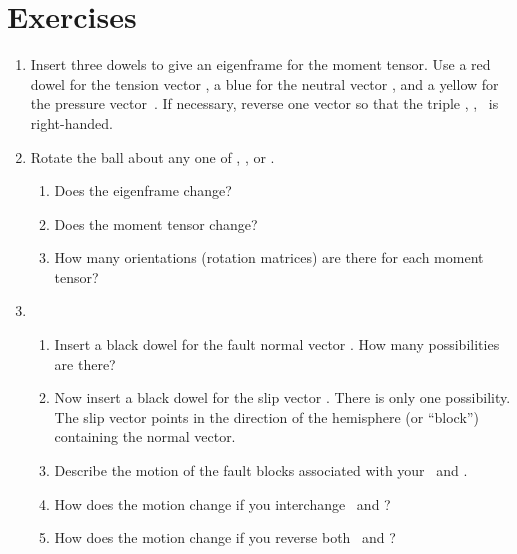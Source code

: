\documentclass[11pt,titlepage,fleqn]{article}
\begin{document}

\pagebreak
\section*{Exercises}

\begin{enumerate}
\item Insert three dowels to give an eigenframe for the moment tensor. Use a red dowel for the tension vector \mbT, a blue for the neutral vector \mbB, and a yellow for the pressure vector~\mbP. If necessary, reverse one vector so that the triple \mbT, \mbB, \mbP\ is right-handed.


\item Rotate the ball  about any one of \mbT, \mbB, or \mbP.
%
\begin{enumerate}
\item Does the eigenframe change?

\item Does the moment tensor change?

\item How many orientations (rotation matrices) are there for each moment tensor?

\end{enumerate}


\item

\begin{enumerate}
\item Insert a black dowel for the fault normal vector \mbN. How many possibilities are there?

\item Now insert a black dowel for the slip vector \mbS. There is only one possibility. The slip vector points in the direction of the hemisphere (or ``block'') containing the normal vector.

\item Describe the motion of the fault blocks associated with your \mbN\ and \mbS.

\item How does the motion change if you interchange \mbN\ and \mbS?

\item How does the motion change if you reverse both \mbN\ and \mbS?

\end{enumerate}


\end{enumerate}
\end{document}
